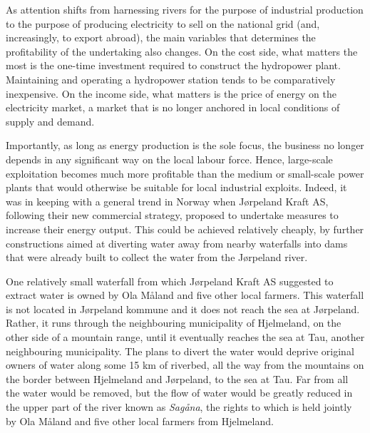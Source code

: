 As attention shifts from harnessing rivers for the purpose of industrial production to the purpose of producing electricity to sell on the national grid (and, increasingly, to export abroad), the main variables that determines the profitability of the undertaking also changes. On the cost side, what matters the most is the one-time investment required to construct the hydropower plant. Maintaining and operating a hydropower station tends to be comparatively inexpensive. On the income side, what matters is the price of energy on the electricity market, a market that is no longer anchored in local conditions of supply and demand.

Importantly, as long as energy production is the sole focus, the business no longer depends in any significant way on the local labour force. Hence, large-scale exploitation becomes much more profitable than the medium or small-scale power plants that would otherwise be suitable for local industrial exploits. Indeed, it was in keeping with a general trend in Norway when Jørpeland Kraft AS, following  their new commercial strategy, proposed to undertake measures to increase their energy output. This could be achieved relatively cheaply, by further constructions aimed at diverting water away from nearby waterfalls into dams that were already built to collect the water from the Jørpeland river.

One relatively small waterfall from which Jørpeland Kraft AS suggested to extract water is owned by Ola Måland and five other local farmers. This waterfall is not located in Jørpeland kommune and it does not reach the sea at Jørpeland. Rather, it runs through the neighbouring municipality of Hjelmeland, on the other side of a mountain range, until it eventually reaches the sea at Tau, another neighbouring municipality. The plans to divert the water would deprive original owners of water along some 15 km of riverbed, all the way from the mountains on the border between Hjelmeland and Jørpeland, to the sea at Tau. Far from all the water would be removed, but the flow of water would be greatly reduced in the upper part of the river known as {\it Sagåna}, the rights to which is held jointly by Ola Måland and five other local farmers from Hjelmeland.

